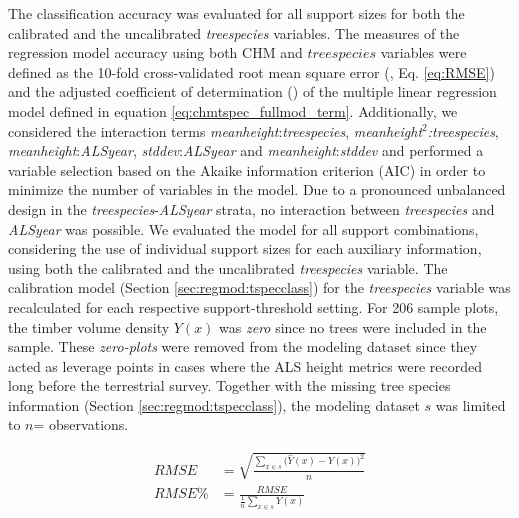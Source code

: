  The classification accuracy was evaluated for all support sizes for both the calibrated and the uncalibrated \textit{treespecies} variables. The measures of the regression model accuracy using both CHM and $treespecies$ variables were defined as the 10-fold cross-validated root mean square error (\rmsecv{}, Eq. \ref{eq:RMSE}) and the adjusted coefficient of determination (\adjrsq{}) of the multiple linear regression model defined in equation \ref{eq:chmtspec_fullmod_term}. Additionally, we considered the interaction terms \textit{meanheight}:\textit{treespecies}, \textit{meanheight$^{2}$:treespecies}, \textit{meanheight}:\textit{ALSyear}, \textit{stddev}:\textit{ALSyear} and \textit{meanheight}:\textit{stddev} and performed a variable selection based on the Akaike information criterion (AIC) \citep{Akaike2011} in order to minimize the number of variables in the model. Due to a pronounced unbalanced design in the \textit{treespecies}-\textit{ALSyear} strata, no interaction between \textit{treespecies} and \textit{ALSyear} was possible. We evaluated the model for all support combinations, considering the use of individual support sizes for each auxiliary information, using both the calibrated and the uncalibrated \textit{treespecies} variable. The calibration model (Section \ref{sec:regmod:tspecclass}) for the \textit{treespecies} variable was recalculated for each respective support-threshold setting. For 206 sample plots, the timber volume density $Y(x)$ was \textit{zero} since no trees were included in the sample. These \textit{zero-plots} were removed from the modeling dataset since they acted as leverage points in cases where the ALS height metrics were recorded long before the terrestrial survey. Together with the missing tree species information (Section \ref{sec:regmod:tspecclass}), the modeling dataset $s$ was limited to $n$= observations.

\begin{subequations}\label{eq:RMSE}
	\begin{align}
	RMSE &= \sqrt{\frac{\sum_{x \in s}\big(\hat{Y}(x)-Y(x)\big)^2}{n}} \label{eq:RMSEa}\\
	RMSE\% &= \frac{RMSE}{\frac{1}{n}\sum_{x \in s}Y(x)}	\label{eq:RMSEb}
	\end{align}
\end{subequations}


